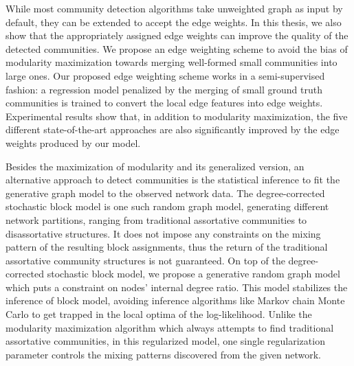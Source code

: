While most community detection algorithms take unweighted graph as input by default, they can be extended to accept the edge weights. In this thesis, we also show that the appropriately assigned edge weights can improve the quality of the detected communities. We propose an edge weighting scheme to avoid the bias of modularity maximization towards merging well-formed small communities into large ones. Our proposed edge weighting scheme works in a semi-supervised fashion: a regression model penalized by the merging of small ground truth communities is trained to convert the local edge features into edge weights. Experimental results show that, in addition to modularity maximization, the five different state-of-the-art approaches are also significantly improved by the edge weights produced by our model.

Besides the maximization of modularity and its generalized version, an alternative approach to detect communities is the statistical inference to fit the generative graph model to the observed network data. The degree-corrected stochastic block model is one such random graph model, generating different network partitions, ranging from traditional assortative communities to disassortative structures. It does not impose any constraints on the mixing pattern of the resulting block assignments, thus the return of the traditional assortative community structures is not guaranteed. On top of the degree-corrected stochastic block model, we propose a generative random graph model which puts a constraint on nodes' internal degree ratio. This model stabilizes the inference of block model, avoiding inference algorithms like Markov chain Monte Carlo to get trapped in the local optima of the log-likelihood. Unlike the modularity maximization algorithm which always attempts to find traditional assortative communities, in this regularized model, one single regularization parameter controls the mixing patterns discovered from the given network.

